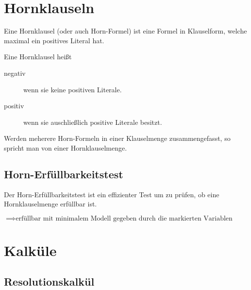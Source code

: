 	\section{Hornklauseln}
		Eine Hornklausel (oder auch Horn-Formel) ist eine Formel in Klauselform, welche maximal ein positives Literal hat.


		Eine Hornklausel heißt
		\begin{description}
			\item[negativ] wenn sie keine positiven Literale.
			\item[positiv] wenn sie auschließlich positive Literale besitzt.
		\end{description}

		Werden meherere Horn-Formeln in einer Klauselmenge zusammengefasst, so spricht man von einer Hornklauselmenge.

		\subsection{Horn-Erfüllbarkeitstest}
			Der Horn-Erfüllbarkeitstest ist ein effizienter Test um zu prüfen, ob eine Hornklauselmenge erfüllbar ist.

			\begin{algorithm}[H]

				$ \implies \text{erfüllbar mit minimalem Modell gegeben durch die markierten Variablen} $
			\end{algorithm}

	\section{Kalküle}
		\subsection{Resolutionskalkül}
			\label{subsec:reso}

